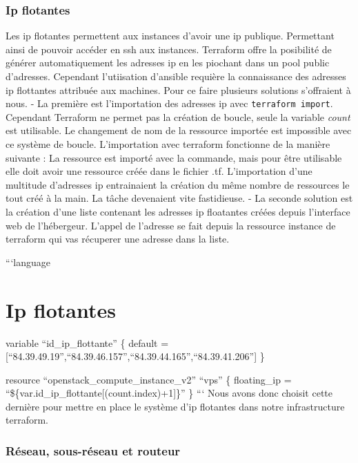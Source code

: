 \documentclass[]{article}
\begin{document}
\subsubsection{Ip flotantes}\label{ip-flotantes}

Les ip flotantes permettent aux instances d'avoir une ip publique.
Permettant ainsi de pouvoir accéder en ssh aux instances. Terraform
offre la posibilité de générer automatiquement les adresses ip en les
piochant dans un pool public d'adresses. Cependant l'utiisation
d'ansible requière la connaissance des adresses ip flottantes attribuée
aux machines. Pour ce faire plusieurs solutions s'offraient à nous. - La
première est l'importation des adresses ip avec
\texttt{terraform\ import}. Cependant Terraform ne permet pas la
création de boucle, seule la variable \emph{count} est utilisable. Le
changement de nom de la ressource importée est impossible avec ce
système de boucle. L'importation avec terraform fonctionne de la manière
suivante : La ressource est importé avec la commande, mais pour être
utilisable elle doit avoir une ressource créée dans le fichier .tf.
L'importation d'une multitude d'adresses ip entrainaient la création du
même nombre de ressources le tout créé à la main. La tâche devenaient
vite fastidieuse. - La seconde solution est la création d'une liste
contenant les adresses ip floatantes créées depuis l'interface web de
l'hébergeur. L'appel de l'adresse se fait depuis la ressource instance
de terraform qui vas récuperer une adresse dans la liste.

```language

\section{Ip flotantes}\label{ip-flotantes-1}

variable ``id\_ip\_flottante'' \{ default =
{[}``84.39.49.19'',``84.39.46.157'',``84.39.44.165'',``84.39.41.206''{]}
\}

resource ``openstack\_compute\_instance\_v2'' ``vps'' \{ floating\_ip =
``\$\{var.id\_ip\_flottante{[}(count.index)+1{]}\}'' \} ``` Nous avons
donc choisit cette dernière pour mettre en place le système d'ip
flotantes dans notre infrastructure terraform.

\subsubsection{Réseau, sous-réseau et
routeur}\label{ruxe9seau-sous-ruxe9seau-et-routeur}
\end{document}
